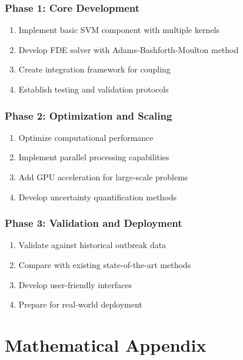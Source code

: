 \documentclass[12pt,a4paper]{report}
\begin{document}
\subsection{Phase 1: Core Development}

\begin{enumerate}
    \item Implement basic SVM component with multiple kernels
    \item Develop FDE solver with Adams-Bashforth-Moulton method
    \item Create integration framework for coupling
    \item Establish testing and validation protocols
\end{enumerate}

\subsection{Phase 2: Optimization and Scaling}

\begin{enumerate}
    \item Optimize computational performance
    \item Implement parallel processing capabilities
    \item Add GPU acceleration for large-scale problems
    \item Develop uncertainty quantification methods
\end{enumerate}

\subsection{Phase 3: Validation and Deployment}

\begin{enumerate}
    \item Validate against historical outbreak data
    \item Compare with existing state-of-the-art methods
    \item Develop user-friendly interfaces
    \item Prepare for real-world deployment
\end{enumerate}

\appendix

\chapter{Mathematical Appendix}
\end{document}
